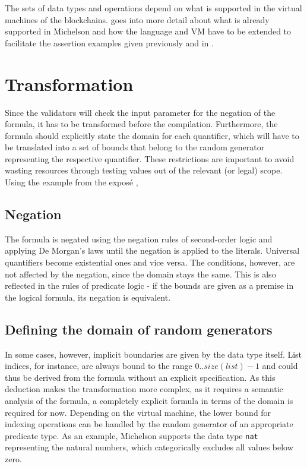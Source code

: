 The sets of data types and operations depend on what is supported in the virtual machines of the blockchains.  goes into more detail about what is already supported in Michelson and how the language and VM have to be extended to facilitate the assertion examples given previously and in .

\section{Transformation}\label{sec:transformation}
Since the validators will check the input parameter for the negation of the formula, it has to be transformed before the compilation. Furthermore, the formula should explicitly state the domain for each quantifier, which will have to be translated into a set of bounds that belong to the random generator representing the respective quantifier. These restrictions are important to avoid wasting resources  through testing values out of the relevant (or legal) scope.
Using the example from the exposé \cite{thiemann_2020}, 


\subsection{Negation}
The formula is negated using the negation rules of second-order logic and applying De Morgan's laws until the negation is applied to the literals. Universal quantifiers become existential ones and vice versa. The conditions, however, are not affected by the negation, since the domain stays the same. This is also reflected in the rules of predicate logic - if the bounds are given as a premise in the logical formula, its negation is equivalent.

\subsection{Defining the domain of random generators}
In some cases, however, implicit boundaries are given by the data type itself. List indices, for instance, are always bound to the range $0.. size(list) - 1$ and could thus be derived from the formula without an explicit specification. As this deduction makes the transformation more complex, as it requires a semantic analysis of the formula, a completely explicit formula in terms of the domain is required for now. Depending on the virtual machine, the lower bound for indexing operations can be handled by the random generator of an appropriate predicate type. As an example, Michelson supports the data type \texttt{nat} representing the natural numbers, which categorically excludes all values below zero.

